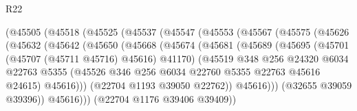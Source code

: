\begin{lexlean}{R22}
\begin{coremodule}
                          (@45505
                            (@45518
                              (@45525
                                (@45537
                                  (@45547
                                    (@45553
                                      (@45567
                                        (@45575
                                          (@45626
                                            (@45632
                                              (@45642
                                                (@45650
                                                  (@45668
                                                    (@45674
                                                      (@45681
                                                        (@45689
                                                          (@45695
                                                            (@45701
                                                              (@45707 (@45711 @45716) @45616)
                                                              @41170)
                                                            (@45519
                                                              @348
                                                              @256
                                                              @24320
                                                              @6034
                                                              @22763
                                                              @5355
                                                              (@45526
                                                                @346
                                                                @256
                                                                @6034
                                                                @22760
                                                                @5355
                                                                @22763
                                                                @45616
                                                                @24615)
                                                              @45616)))
                                                        (@22704 @1193 @39050 @22762))
                                                      @45616)))
                                                (@32655 @39059 @39396))
                                              @45616)))
                                        (@22704 @1176 @39406 @39409))

\end{coremodule}
\end{lexlean}
